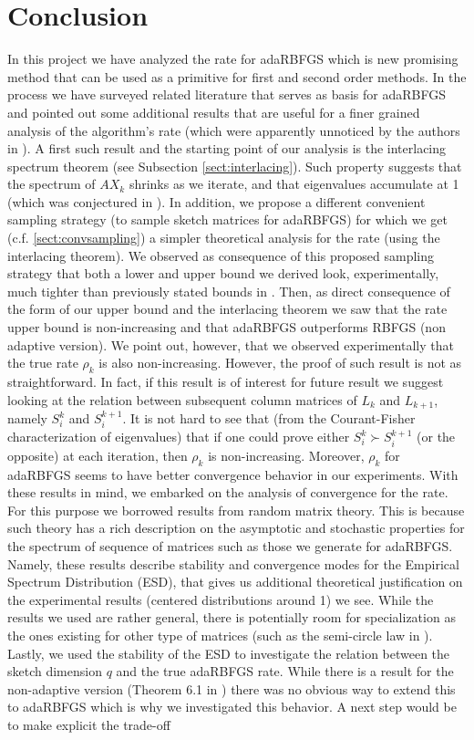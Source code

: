 \documentclass[12pt,conference,compsocconf]{IEEEtran}
\begin{document}
\section{Conclusion}\label{sect:conclusion}
In this project we have analyzed the rate for adaRBFGS which is new promising method that can be used as a primitive for first and second order methods. In the process we have surveyed related literature that serves as basis for adaRBFGS and pointed out some additional results that are useful for a finer grained analysis of the algorithm's rate (which were apparently unnoticed by the authors in \cite{Gower1}). A first such result and the starting point of our analysis is the interlacing spectrum theorem (see Subsection \ref{sect:interlacing}). Such property suggests that the spectrum of $AX_k$ shrinks as we iterate, and that eigenvalues accumulate at 1 (which was conjectured in \cite{Gower1}). In addition, we propose a different convenient sampling strategy (to sample sketch matrices for adaRBFGS) for which we get (c.f. \ref{sect:convsampling}) a simpler theoretical analysis for the rate (using the interlacing theorem). We observed as consequence of this proposed sampling strategy that both a lower and upper bound we derived look, experimentally, much tighter than previously stated bounds in \cite{Gower1}. Then, as direct consequence of the form of our upper bound and the interlacing theorem we saw that the rate upper bound is non-increasing and that adaRBFGS outperforms RBFGS (non adaptive version). We point out, however, that we observed experimentally that the true rate $\rho_k$ is also non-increasing. However, the proof of such result is not as straightforward. In fact, if this result is of interest for future result we suggest looking at the relation between subsequent column matrices of $L_k$ and $L_{k+1}$, namely $S_i^k$ and $S_i^{k+1}$. It is not hard to see that (from the Courant-Fisher characterization of eigenvalues) that if one could prove either $S_i^k \succ S_i^{k+1}$ (or the opposite) at each iteration, then $\rho_k$ is non-increasing. Moreover, $\rho_k$ for adaRBFGS seems to have better convergence behavior in our experiments. With these results in mind, we embarked on the analysis of convergence for the rate. For this purpose we borrowed results from random matrix theory. This is because such theory has a rich description on the asymptotic and stochastic properties for the spectrum of sequence of matrices such as those we generate for adaRBFGS. Namely, these results describe stability and convergence modes for the Empirical Spectrum Distribution (ESD), that gives us additional theoretical justification on the experimental results (centered distributions around 1) we see. While the results we used are rather general, there is potentially room for specialization as the ones existing for other type of matrices (such as the semi-circle law in \cite{Tao}). Lastly, we used the stability of the ESD to investigate the relation between the sketch dimension $q$ and the true adaRBFGS rate. While there is a result for the non-adaptive version (Theorem 6.1 in \cite{Gower1}) there was no obvious way to extend this to adaRBFGS which is why we investigated this behavior. A next step would be to make explicit the trade-off 
\end{document}
